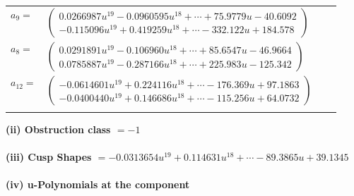 \documentclass[1p]{elsarticle_modified}
\theoremstyle{definition}
\begin{document}
\begin{tabular}{m{7pt} m{180pt} m{7pt} m{180pt} }
\flushright $a_{9}=$&$\begin{pmatrix}0.0266987 u^{19}-0.0960595 u^{18}+\cdots+75.9779 u-40.6092\\-0.115096 u^{19}+0.419259 u^{18}+\cdots-332.122 u+184.578\end{pmatrix}$ \\
\flushright $a_{8}=$&$\begin{pmatrix}0.0291891 u^{19}-0.106960 u^{18}+\cdots+85.6547 u-46.9664\\0.0785887 u^{19}-0.287166 u^{18}+\cdots+225.983 u-125.342\end{pmatrix}$ \\
\flushright $a_{12}=$&$\begin{pmatrix}-0.0614601 u^{19}+0.224116 u^{18}+\cdots-176.369 u+97.1863\\-0.0400440 u^{19}+0.146686 u^{18}+\cdots-115.256 u+64.0732\end{pmatrix}$\\&\end{tabular}
\flushleft \textbf{(ii) Obstruction class $= -1$}\\~\\
\flushleft \textbf{(iii) Cusp Shapes $= -0.0313654 u^{19}+0.114631 u^{18}+\cdots-89.3865 u+39.1345$}\\~\\
\newpage\renewcommand{\arraystretch}{1}
\flushleft \textbf{(iv) u-Polynomials at the component}\newline \\
\end{document}
